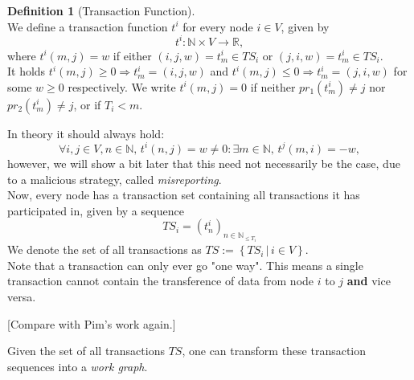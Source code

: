 \documentclass[11pt,a4paper]{report}
\theoremstyle{definition}
\newtheorem{definition}{Definition}[section]
\theoremstyle{theorem}
\theoremstyle{proposition}
\theoremstyle{corollary}
\theoremstyle{lemma}
\theoremstyle{example}
\theoremstyle{remark}
\begin{document}
\begin{definition}[Transaction Function]\ \\
\noindent{}We define a transaction function $t^i$ for every node $i\in{}V$, given by 
\[
t^i:\mathbb{N}\times{}V\rightarrow{}\mathbb{R},
\]
\noindent{}where $t^i(m,j)=w$ if either $(i,j,w)=t_m^i\in{}TS_i$ or $(j,i,w)=t_m^i\in{}TS_i$. \vspace{1em}\\ 
\noindent{}It holds $t^i(m,j)\geq{}0\Rightarrow t^i_m=(i,j,w)$ and $t^i(m,j)\leq{}0\Rightarrow t^i_m=(j,i,w)$ for some $w\geq{}0$ respectively. We write $t^i(m,j)=0$ if neither $pr_1(t^i_m)\neq{}j$ nor $pr_2(t^i_m)\neq{}j$, or if $T_i<m$.\vspace{1em}\\
\end{definition}

\noindent{}In theory it should always hold:
\[
\forall{}i,j\in{}V,n\in\mathbb{N},\,t^i(n,j)=w\neq{}0:\exists{}m\in\mathbb{N},\,t^j(m,i)=-w,
\]
\noindent{}however, we will show a bit later that this need not necessarily be the case, due to a malicious strategy, called {\it misreporting}. \vspace{1em}\\
\noindent{}Now, every node has a transaction set containing all transactions it has participated in, given by a sequence
\[
TS_i=\left(t^i_n\right)_{n\in\mathbb{N}_{\leq{}T_i}}
\] 
We denote the set of all transactions as $TS:=\left\lbrace{}TS_i\,|\,i\in{}V\right\rbrace.$ \vspace{1em}\\ %

\noindent{}Note that a transaction can only ever go "one way". This means a single transaction cannot contain the transference of data from node $i$ to $j$ {\bf and} vice versa. \vspace{1em}\\

\noindent{}\begin{center}[Compare with Pim's work again.] \vspace{1em}\\ \end{center}

\noindent{}Given the set of all transactions $TS$, one can transform these transaction sequences into a {\it work graph}. \vspace{1em}\\
\end{document}

